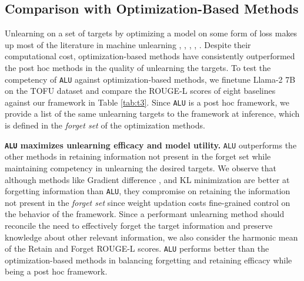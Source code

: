 \subsection{Comparison with Optimization-Based Methods}
\label{sec:5.1}
Unlearning on a set of targets by optimizing a model on some form of loss makes up most of the literature in machine unlearning \cite{yao2024largelanguagemodelunlearning, fan2024salunempoweringmachineunlearning}, \cite{kurmanji2023unboundedmachineunlearning}, \cite{maini2024tofu}, \cite{zhang2024negativepreferenceoptimizationcatastrophic}, \cite{choi2024optoutinvestigatingentitylevelunlearning}. Despite their computational cost, optimization-based methods have consistently outperformed the post hoc methods in the quality of unlearning the targets. To test the competency of \texttt{ALU} against optimization-based methods, we finetune Llama-2 7B \cite{touvron2023llama2openfoundation} on the TOFU dataset \cite{maini2024tofu} and compare the ROUGE-L \cite{lin-2004-rouge} scores of eight baselines against our framework in Table \ref{tab:t3}. Since \texttt{ALU} is a post hoc framework, we provide a list of the same unlearning targets to the framework at inference, which is defined in the \emph{forget set} of the optimization methods.

\textbf{\texttt{ALU} maximizes unlearning efficacy and model utility.} \texttt{ALU} outperforms the other methods in retaining information not present in the forget set while maintaining competency in unlearning the desired targets. We observe that although methods like Gradient difference \cite{fan2024salunempoweringmachineunlearning}, \cite{kurmanji2023machineunlearninglearneddatabases} and KL minimization \cite{maini2024tofu} are better at forgetting information than \texttt{ALU}, they compromise on retaining the information not present in the \emph{forget set} since weight updation costs fine-grained control on the behavior of the framework. Since a performant unlearning method should reconcile the need to effectively forget the target information and preserve knowledge about other relevant information, we also consider the harmonic mean of the Retain and Forget ROUGE-L scores. \texttt{ALU} performs better than the optimization-based methods in balancing forgetting and retaining efficacy while being a post hoc framework.


